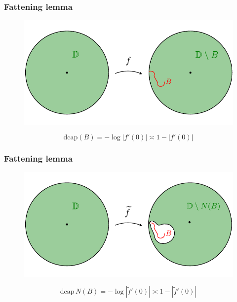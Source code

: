 \documentclass[xcolor=pdftex,dvipsnames,table]{beamer}
\newcommand{\dcap}{\text{dcap}}
\theoremstyle{definition}
\begin{document}
\begin{frame}
  \frametitle{Fattening lemma}
  \begin{figure}
    \includegraphics[scale=0.8]{fattening_03.pdf}
  \end{figure}
  \[
      \dcap(B) = - \log \left| f'(0) \right| \asymp 1 - \left| f'(0) \right|
  \]  
\end{frame}

\begin{frame}
  \frametitle{Fattening lemma}
  \begin{figure}
    \includegraphics[scale=0.8]{fattening_04.pdf}
  \end{figure}
  \[
      \dcap \, N(B) = - \log \left| \widetilde{f}'(0) \right| \asymp 1 - \left| \widetilde{f}'(0) \right|
  \]  
\end{frame}
\end{document}
